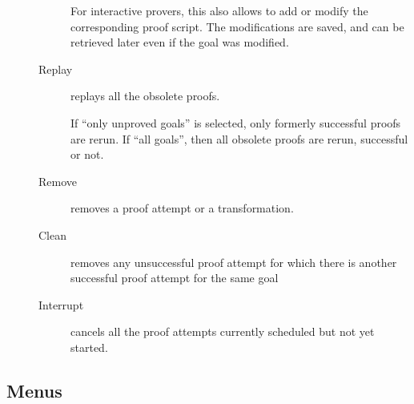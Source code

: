 \begin{description}
\begin{description}
  For interactive provers, this also allows to add or modify the
  corresponding proof script. The modifications are saved, and can be
  retrieved later even if the goal was modified.

\item[Replay] replays all the obsolete proofs.

  If ``only unproved goals'' is selected, only formerly successful
  proofs are rerun. If ``all goals'', then all obsolete proofs are
  rerun, successful or not.

\item[Remove] removes a proof attempt or a transformation.

\item[Clean] removes any unsuccessful proof attempt for which there is
  another successful proof attempt for the same goal

\item[Interrupt] cancels all the proof attempts currently scheduled
  but not yet started.
\end{description}

\end{description}

\subsection{Menus}

